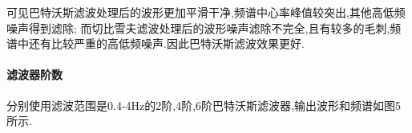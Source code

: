 \documentclass[12pt, a4paper, oneside]{ctexart}
\begin{document}
      可见巴特沃斯滤波处理后的波形更加平滑干净,频谱中心率峰值较突出,其他高低频噪声得到滤除;
      而切比雪夫滤波处理后的波形噪声滤除不完全,且有较多的毛刺,频谱中还有比较严重的高低频噪声.因此巴特沃斯滤波效果更好.

     
      \newpage
       \paragraph{滤波器阶数}
       分别使用滤波范围是0.4-4Hz的2阶,4阶,6阶巴特沃斯滤波器,输出波形和频谱如图5所示.

       \begin{figure}[H]
        \centering
          \subfigure[6阶;波形]{
}
\end{figure}
\end{document}
